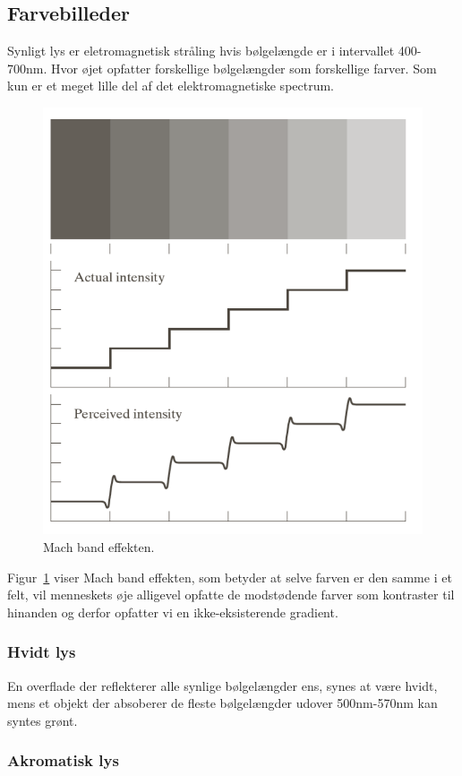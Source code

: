 \subsection{Farvebilleder}

Synligt lys er eletromagnetisk stråling hvis bølgelængde er i intervallet 400-700nm. Hvor øjet opfatter forskellige bølgelængder som forskellige farver. Som kun er et meget lille del af det elektromagnetiske spectrum.

\begin{figure}[H]
	\centering
	\includegraphics[width=0.7\linewidth]{figs/spm07/mach-band-effect}
	\caption{Mach band effekten.}
	\label{fig:mach-band-effect}
\end{figure}

Figur~\ref{fig:mach-band-effect} viser Mach band effekten, som betyder at selve farven er den samme i et felt, vil menneskets øje alligevel opfatte de modstødende farver som kontraster til hinanden og derfor opfatter vi en ikke-eksisterende gradient.

\subsubsection{Hvidt lys}

En overflade der reflekterer alle synlige bølgelængder ens, synes at være hvidt, mens et objekt der absoberer de fleste bølgelængder udover 500nm-570nm kan syntes grønt.

\subsubsection{Akromatisk lys}

